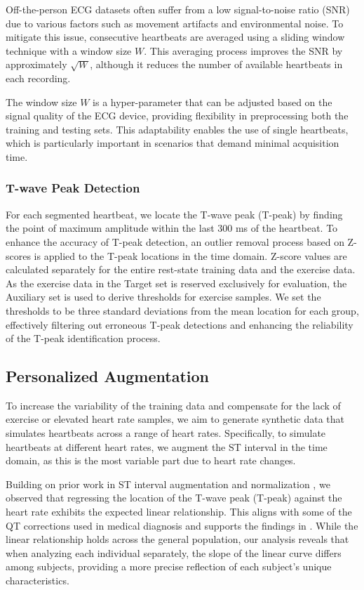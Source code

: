 Off-the-person ECG datasets often suffer from a low signal-to-noise ratio (SNR) due to various factors such as movement artifacts and environmental noise. To mitigate this issue, consecutive heartbeats are averaged using a sliding window technique with a window size $W$. This averaging process improves the SNR by approximately $\sqrt{W}$, although it reduces the number of available heartbeats in each recording.

The window size $W$ is a hyper-parameter that can be adjusted based on the signal quality of the ECG device, providing flexibility in preprocessing both the training and testing sets. This adaptability enables the use of single heartbeats, which is particularly important in scenarios that demand minimal acquisition time.

\subsubsection{T-wave Peak Detection}
For each segmented heartbeat, we locate the T-wave peak (T-peak) by finding the point of maximum amplitude within the last 300 ms of the heartbeat. To enhance the accuracy of T-peak detection, an outlier removal process based on Z-scores is applied to the T-peak locations in the time domain.
Z-score values are calculated separately for the entire rest-state training data and the exercise data.
As the exercise data in the Target set is reserved exclusively for evaluation, the Auxiliary set is used to derive thresholds for exercise samples.
We set the thresholds to be three standard deviations from the mean location for each group, effectively filtering out erroneous T-peak detections and enhancing the reliability of the T-peak identification process.

\subsection{Personalized Augmentation}

To increase the variability of the training data and compensate for the lack of exercise or elevated heart rate samples, we aim to generate synthetic data that simulates heartbeats across a range of heart rates.
Specifically, to simulate heartbeats at different heart rates, we augment the ST interval in the time domain, as this is the most variable part due to heart rate changes.

Building on prior work in ST interval augmentation \cite{Kim2022} and normalization \cite{Hwang2021}, we observed that regressing the location of the T-wave peak (T-peak) against the heart rate exhibits the expected linear relationship. This aligns with some of the QT corrections used in medical diagnosis \cite{hodges1983bazett, SAGIE1992797} and supports the findings in \cite{Hwang2021}.
While the linear relationship holds across the general population, our analysis reveals that when analyzing each individual separately, the slope of the linear curve differs among subjects, providing a more precise reflection of each subject's unique characteristics.


